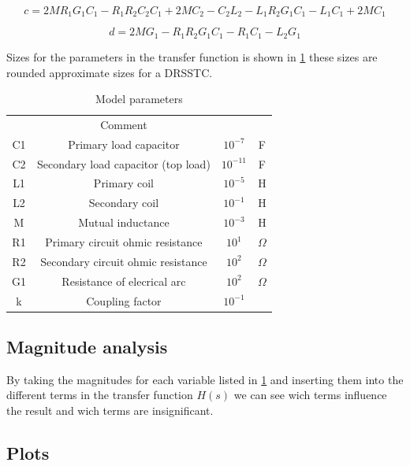\begin{equation} \label{eq:4_3}
    c = 2 M R_1 G_1 C_1 - R_1 R_2 C_2 C_1 + 2 M C_2 - C_2 L_2 - L_1 R_2 G_1 C_1 - L_1 C_1 + 2 M C_1
\end{equation}

\begin{equation} \label{eq:4_4}
    d = 2 M G_1 - R_1 R_2 G_1 C_1 - R_1 C_1 - L_2 G_1
\end{equation}

Sizes for the parameters in the transfer function is shown in \cref{tab:mod_params} these sizes are rounded approximate sizes for a DRSSTC.

\begin{table}[]
    \centering
    \begin{tabular}{c|c|c|c}
         & Comment &  &\\
        C1 & Primary load capacitor                 & $10^{-7}$ & F \\
        C2 & Secondary load capacitor (top load)    & $10^{-11}$& F \\
        L1 & Primary coil                           & $10^{-5}$ & H \\
        L2 & Secondary coil                         & $10^{-1}$ & H \\
        M  & Mutual inductance                      & $10^{-3}$ & H \\
        R1 & Primary circuit ohmic resistance       & $10^{1}$  & $\Omega$ \\
        R2 & Secondary circuit ohmic resistance     & $10^{2}$  & $\Omega$ \\
        G1 & Resistance of elecrical arc            & $10^{2}$  & $\Omega$ \\ %
        k  & Coupling factor                        & $10^{-1}$ &
    \end{tabular}
    \caption{Model parameters}
    \label{tab:mod_params}
\end{table}

\subsection{Magnitude analysis}
By taking the magnitudes for each variable listed in \cref{tab:mod_params} and inserting them into the different terms in the transfer function $H(s)$ we can see wich terms influence the result and wich terms are insignificant.

\subsection{Plots}

